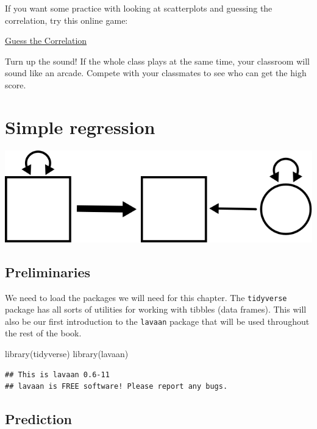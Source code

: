 \documentclass[
]{book}
\newenvironment{Shaded}{\begin{snugshade}}{\end{snugshade}}
\newcommand{\FunctionTok}[1]{\textcolor[rgb]{0.00,0.00,0.00}{#1}}
\newcommand{\NormalTok}[1]{#1}
\begin{document}
If you want some practice with looking at scatterplots and guessing the correlation, try this online game:

\href{http://guessthecorrelation.com/}{Guess the Correlation}

Turn up the sound! If the whole class plays at the same time, your classroom will sound like an arcade. Compete with your classmates to see who can get the high score.

\hypertarget{simple}{%
\chapter{Simple regression}\label{simple}}

\begin{center}\includegraphics{graphics/simple_regression} \end{center}

\hypertarget{preliminaries}{%
\section*{Preliminaries}\label{preliminaries}}

We need to load the packages we will need for this chapter. The \texttt{tidyverse} package has all sorts of utilities for working with tibbles (data frames). This will also be our first introduction to the \texttt{lavaan} package that will be used throughout the rest of the book.

\begin{Shaded}
\begin{Highlighting}[]
\FunctionTok{library}\NormalTok{(tidyverse)}
\FunctionTok{library}\NormalTok{(lavaan)}
\end{Highlighting}
\end{Shaded}

\begin{verbatim}
## This is lavaan 0.6-11
## lavaan is FREE software! Please report any bugs.
\end{verbatim}

\hypertarget{simple-prediction}{%
\section{Prediction}\label{simple-prediction}}
\end{document}
